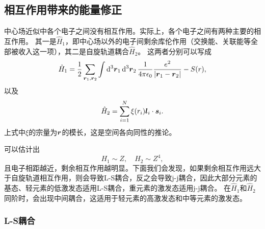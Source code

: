 
\subsection{相互作用带来的能量修正}

中心场近似中各个电子之间没有相互作用。实际上，各个电子之间有两种主要的相互作用。
其一是$\hat{H}_1$，即中心场以外的电子间剩余库伦作用（交换能、关联能等全部被收入这一项），其二是自旋轨道耦合$\hat{H}_2$。
这两者分别可以写成
\begin{equation}
    \hat{H}_1 = \frac{1}{2} \sum_{\vb*{r}_1, \vb*{r}_2} \int \dd[3]{\vb*{r}_1} \dd[3]{\vb*{r}_2} \frac{1}{4 \pi \epsilon_0} \frac{e^2}{\abs{\vb*{r}_1 - \vb*{r}_2}} - S(r),
\end{equation}
以及
\begin{equation}
    \hat{H}_2 = \sum_{i=1}^N \xi(r_i) \vb*{l}_i \cdot \vb*{s}_i.
    \label{eq:spin-orbital-many}
\end{equation}
上式中$\xi$的宗量为$\vb*{r}$的模长，这是空间各向同性的推论。

可以估计出
\[
    H_1 \sim Z, \quad H_2 \sim Z^4,
\]
且电子相距越近，剩余相互作用越明显。下面我们会发现，如果剩余相互作用远大于自旋轨道相互作用，则会导致L-S耦合，反之会导致j-j耦合，因此大部分元素的基态、轻元素的低激发态适用L-S耦合，重元素的激发态适用j-j耦合。
在$\hat{H}_1$和$\hat{H}_2$同阶时，会出现中间耦合，这适用于轻元素的高激发态和中等元素的激发态。

\subsubsection{L-S耦合}\label{sec:ls-coupling}


